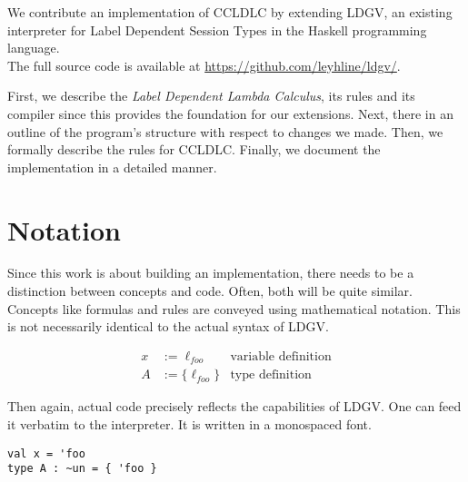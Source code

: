 We contribute an implementation of CCLDLC by extending LDGV, an existing interpreter for Label Dependent Session Types in the Haskell programming language.
\\
The full source code is available at \url{https://github.com/leyhline/ldgv/}.

First, we describe the \emph{Label Dependent Lambda Calculus}, its rules and its compiler since this provides the foundation for our extensions. Next, there in an outline of the program's structure with respect to changes we made. Then, we formally describe the rules for CCLDLC. Finally, we document the implementation in a detailed manner.

\section{Notation}

Since this work is about building an implementation, there needs to be a distinction between concepts and code. Often, both will be quite similar. Concepts like formulas and rules are conveyed using mathematical notation. This is not necessarily identical to the actual syntax of LDGV.

\begin{align*}
 x &:= \ell_{foo} & \text{variable definition} \\
 A &:= \{ \ell_{foo} \} & \text{type definition}
\end{align*}

Then again, actual code precisely reflects the capabilities of LDGV. One can feed it verbatim to the interpreter. It is written in a monospaced font.

\begin{lstlisting}[language=ldgv,caption=Code listing example]
val x = 'foo
type A : ~un = { 'foo }
\end{lstlisting}
